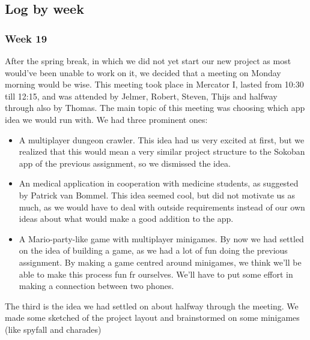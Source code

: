\documentclass[../main.tex]{subfiles}
\begin{document}
\pagebreak
\subsection{Log by week}
\subsubsection*{Week 19}
After the spring break, in which we did not yet start our new project as most would've been unable to work on it, we decided that a meeting on Monday morning would be wise. This meeting took place in Mercator I, lasted from 10:30 till 12:15, and was attended by Jelmer, Robert, Steven, Thijs and halfway through also by Thomas.
The main topic of this meeting was choosing which app idea we would run with. We had three prominent ones:
\begin{itemize}
	\item A multiplayer dungeon crawler. This idea had us very excited at first, but we realized that this would mean a very similar project structure to the Sokoban app of the previous assignment, so we dismissed the idea.
	\item An medical application in cooperation with medicine students, as suggested by Patrick van Bommel. This idea seemed cool, but did not motivate us as much, as we would have to deal with outside requirements instead of our own ideas about what would make a good addition to the app.
	\item A Mario-party-like game with multiplayer minigames. By now we had settled on the idea of building a game, as we had a lot of fun doing the previous assignment. By making a game centred around minigames, we think we'll be able to make this process fun fr ourselves. We'll have to put some effort in making a connection between two phones.
\end{itemize}

The third is the idea we had settled on about halfway through the meeting. We made some sketched of the project layout and brainstormed on some minigames (like spyfall and charades)
\end{document}
